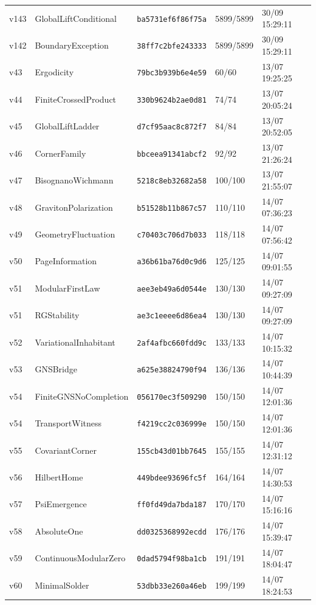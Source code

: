 \documentclass[11pt]{article}
\theoremstyle{definition}\newtheorem{deriv}{Derivation}
\begin{document}
{\begin{longtable}{@{}lllll@{}}
v143 & GlobalLiftConditional & \texttt{ba5731ef6f86f75a} & 5899/5899 & 30/09 15:29:11 \\
v142 & BoundaryException & \texttt{38ff7c2bfe243333} & 5899/5899 & 30/09 15:29:11 \\
v43 & Ergodicity & \texttt{79bc3b939b6e4e59} & 60/60 & 13/07 19:25:25 \\
v44 & FiniteCrossedProduct & \texttt{330b9624b2ae0d81} & 74/74 & 13/07 20:05:24 \\
v45 & GlobalLiftLadder & \texttt{d7cf95aac8c872f7} & 84/84 & 13/07 20:52:05 \\
v46 & CornerFamily & \texttt{bbceea91341abcf2} & 92/92 & 13/07 21:26:24 \\
v47 & BisognanoWichmann & \texttt{5218c8eb32682a58} & 100/100 & 13/07 21:55:07 \\
v48 & GravitonPolarization & \texttt{b51528b11b867c57} & 110/110 & 14/07 07:36:23 \\
v49 & GeometryFluctuation & \texttt{c70403c706d7b033} & 118/118 & 14/07 07:56:42 \\
v50 & PageInformation & \texttt{a36b61ba76d0c9d6} & 125/125 & 14/07 09:01:55 \\
v51 & ModularFirstLaw & \texttt{aee3eb49a6d0544e} & 130/130 & 14/07 09:27:09 \\
v51 & RGStability & \texttt{ae3c1eeee6d86ea4} & 130/130 & 14/07 09:27:09 \\
v52 & VariationalInhabitant & \texttt{2af4afbc660fdd9c} & 133/133 & 14/07 10:15:32 \\
v53 & GNSBridge & \texttt{a625e38824790f94} & 136/136 & 14/07 10:44:39 \\
v54 & FiniteGNSNoCompletion & \texttt{056170ec3f509290} & 150/150 & 14/07 12:01:36 \\
v54 & TransportWitness & \texttt{f4219cc2c036999e} & 150/150 & 14/07 12:01:36 \\
v55 & CovariantCorner & \texttt{155cb43d01bb7645} & 155/155 & 14/07 12:31:12 \\
v56 & HilbertHome & \texttt{449bdee93696fc5f} & 164/164 & 14/07 14:30:53 \\
v57 & PsiEmergence & \texttt{ff0fd49da7bda187} & 170/170 & 14/07 15:16:16 \\
v58 & AbsoluteOne & \texttt{dd0325368992ecdd} & 176/176 & 14/07 15:39:47 \\
v59 & ContinuousModularZero & \texttt{0dad5794f98ba1cb} & 191/191 & 14/07 18:04:47 \\
v60 & MinimalSolder & \texttt{53dbb33e260a46eb} & 199/199 & 14/07 18:24:53 \\

\end{longtable}}
\end{document}
